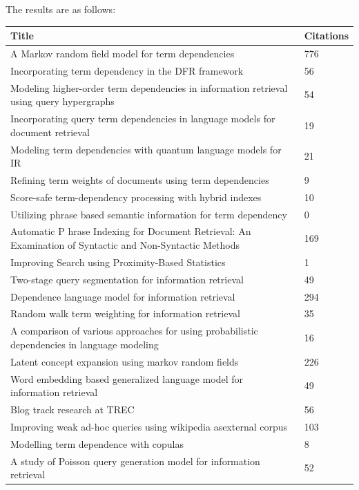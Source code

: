 \documentclass[letterpaper,11pt]{article}
\begin{document}
The results are as follows:

\begin{center}
\begin{longtable}{|*2{p{3.5cm}| }}
\hline
\textbf{Title} & \textbf{Citations} \\ \hline 
A Markov random field model for term dependencies & 776 \\ \hline
Incorporating term dependency in the DFR framework & 56 \\ \hline
Modeling higher-order term dependencies in information retrieval using query hypergraphs & 54 \\ \hline
Incorporating query term dependencies in language models for document retrieval & 19 \\ \hline
Modeling term dependencies with quantum language models for IR & 21 \\ \hline
Refining term weights of documents using term dependencies & 9 \\ \hline
Score-safe term-dependency processing with hybrid indexes & 10 \\ \hline
Utilizing phrase based semantic information for term dependency & 0 \\ \hline
Automatic P hrase Indexing for Document Retrieval: An Examination of Syntactic and Non-Syntactic Methods & 169 \\ \hline
Improving Search using Proximity-Based Statistics & 1 \\ \hline
Two-stage query segmentation for information retrieval & 49 \\ \hline
Dependence language model for information retrieval & 294 \\ \hline
Random walk term weighting for information retrieval & 35 \\ \hline
A comparison of various approaches for using probabilistic dependencies in language modeling & 16 \\ \hline
Latent concept expansion using markov random fields & 226 \\ \hline
Word embedding based generalized language model for information retrieval & 49 \\ \hline
Blog track research at TREC & 56 \\ \hline
Improving weak ad-hoc queries using wikipedia asexternal corpus & 103 \\ \hline
Modelling term dependence with copulas & 8 \\ \hline
A study of Poisson query generation model for information retrieval & 52 \\ \hline

\end{longtable}
\end{center}
\end{document}
